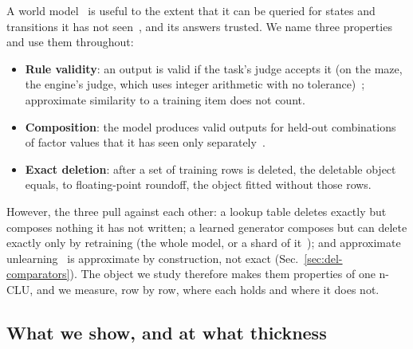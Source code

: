 \documentclass{article} %
\begin{document}
A world model~\citep{ha2018world,hafner2025mastering} is useful to the extent that it can be queried for states and transitions it has
not seen~\citep{valevski2025diffusion}, and its answers trusted. We name three properties and use them throughout:
\begin{itemize}[leftmargin=*,nosep]
\item \textbf{Rule validity}: an output is valid if the task's judge accepts it (on the maze, the engine's judge, which
uses integer arithmetic with no tolerance)~\citep{vafa2024evaluating}; approximate similarity to a training item does not count.
\item \textbf{Composition}: the model produces valid outputs for held-out combinations of
  factor values that it has seen only separately~\citep{zhao2022toward}.
\item \textbf{Exact deletion}: after a set of training rows is deleted, the deletable object
  equals, to floating-point roundoff, the object fitted without those rows.
\end{itemize}
However, the three pull against each other: a lookup table deletes exactly but
composes nothing it has not written; a learned generator composes but can delete exactly only by
retraining (the whole model, or a shard of it~\citep{bourtoule2021machine}); and approximate unlearning~\citep{guo2020certified,golatkar2020eternal} is approximate by construction, not exact (Sec.~\ref{sec:del-comparators}). The object we study therefore makes them properties of one n-CLU, and we measure, row by row, where each holds and where it does not.

\subsection{What we show, and at what thickness}
\label{sec:contrib}
\end{document}

